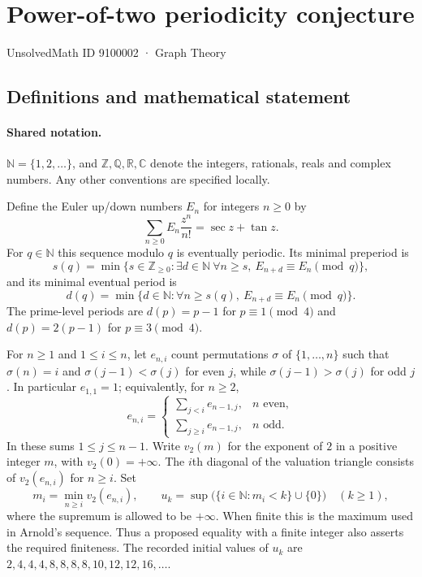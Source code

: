 \documentclass[11pt]{article}
\begin{document}
\setcounter{section}{9100001}
\section{Power-of-two periodicity conjecture}\label{9100002}
{\small\sffamily UnsolvedMath ID 9100002 · Graph Theory}
\subsection{Definitions and mathematical statement}

\paragraph{Shared notation.}$\mathbb N=\{1,2,\ldots\}$, and $\mathbb Z,\mathbb Q,\mathbb R,\mathbb C$ denote the integers, rationals, reals and complex numbers. Any other conventions are specified locally.


Define the Euler up/down numbers $E_n$ for integers $n\ge0$ by
\[
\sum_{n\ge0} E_n\frac{z^n}{n!}=\sec z+\tan z.
\]
For $q\in\mathbb N$ this sequence modulo $q$ is eventually periodic. Its minimal preperiod is
\[
s(q)=\min\{s\in\mathbb Z_{\ge0}:\exists d\in\mathbb N\ \forall n\ge s,\ E_{n+d}\equiv E_n\pmod q\},
\]
and its minimal eventual period is
\[
d(q)=\min\{d\in\mathbb N:\forall n\ge s(q),\ E_{n+d}\equiv E_n\pmod q\}.
\]
The prime-level periods are $d(p)=p-1$ for $p\equiv1\pmod4$ and $d(p)=2(p-1)$ for $p\equiv3\pmod4$.

For $n\ge1$ and $1\le i\le n$, let $e_{n,i}$ count permutations $\sigma$ of $\{1,\ldots,n\}$ such that $\sigma(n)=i$ and $\sigma(j-1)<\sigma(j)$ for even $j$, while $\sigma(j-1)>\sigma(j)$ for odd $j$. In particular $e_{1,1}=1$; equivalently, for $n\ge2$,
\[
e_{n,i}=\begin{cases}\sum_{j<i}e_{n-1,j},&n\text{ even},\\\sum_{j\ge i}e_{n-1,j},&n\text{ odd}.\end{cases}
\]
In these sums $1\le j\le n-1$. Write $v_2(m)$ for the exponent of $2$ in a positive integer $m$, with $v_2(0)=+\infty$. The $i$th diagonal of the valuation triangle consists of $v_2(e_{n,i})$ for $n\ge i$. Set
\[
m_i=\min_{n\ge i}v_2(e_{n,i}),\qquad
u_k=\sup\bigl(\{i\in\mathbb N:m_i<k\}\cup\{0\}\bigr)\quad(k\ge1),
\]
where the supremum is allowed to be $+\infty$. When finite this is the maximum used in Arnold's sequence. Thus a proposed equality with a finite integer also asserts the required finiteness. The recorded initial values of $u_k$ are $2,4,4,4,8,8,8,8,10,12,12,16,\ldots$.
\end{document}
